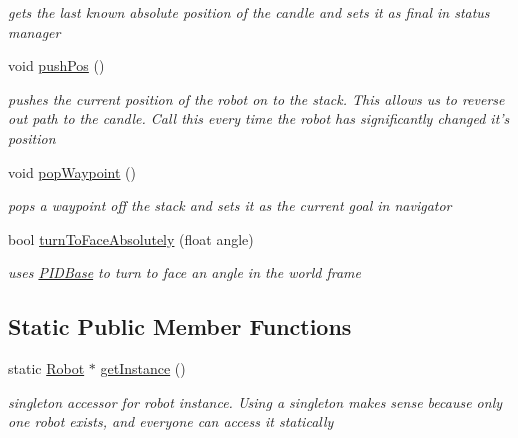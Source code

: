 \begin{DoxyCompactItemize}
\begin{DoxyCompactList}\small\item\em gets the last known absolute position of the candle and sets it as final in status manager \end{DoxyCompactList}\item 
void \hyperlink{classRobot_abec1c3c25468c64565a4e1c934f32d62}{push\-Pos} ()
\begin{DoxyCompactList}\small\item\em pushes the current position of the robot on to the stack. This allows us to reverse out path to the candle. Call this every time the robot has significantly changed it's position \end{DoxyCompactList}\item 
void \hyperlink{classRobot_a7e05e17417f58dd3b9d3d02b365a5df1}{pop\-Waypoint} ()
\begin{DoxyCompactList}\small\item\em pops a waypoint off the stack and sets it as the current goal in navigator \end{DoxyCompactList}\item 
bool \hyperlink{classRobot_a485de0486179cbbdc32561fd87bfe1c2}{turn\-To\-Face\-Absolutely} (float angle)
\begin{DoxyCompactList}\small\item\em uses \hyperlink{classPIDBase}{P\-I\-D\-Base} to turn to face an angle in the world frame \end{DoxyCompactList}\end{DoxyCompactItemize}
\subsection*{Static Public Member Functions}
\begin{DoxyCompactItemize}
\item 
static \hyperlink{classRobot}{Robot} $\ast$ \hyperlink{classRobot_ac6f19dc31b435f8a2d43944ba49286d0}{get\-Instance} ()
\begin{DoxyCompactList}\small\item\em singleton accessor for robot instance. Using a singleton makes sense because only one robot exists, and everyone can access it statically \end{DoxyCompactList}\end{DoxyCompactItemize}
